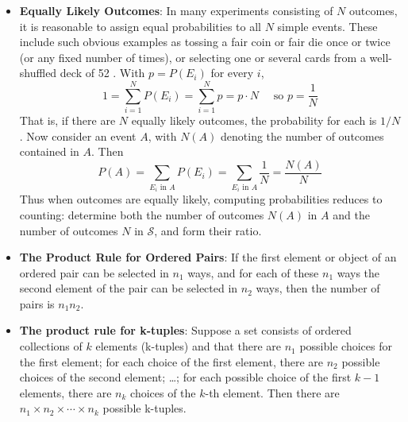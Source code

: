 \documentclass{report}
\begin{document}
\begin{itemize}
$$            $$
        \item \textbf{Equally Likely Outcomes}:
            In many experiments consisting of $N$ outcomes, it is reasonable to assign equal probabilities to all $N$ simple events. These include such obvious examples as tossing a fair coin or fair die once or twice (or any fixed number of times), or selecting one or several cards from a well-shuffled deck of 52 . With $p=P\left(E_i\right)$ for every $i$,
            $$
            1=\sum_{i=1}^N P\left(E_i\right)=\sum_{i=1}^N p=p \cdot N \quad \text { so } p=\frac{1}{N}
            $$
            That is, if there are $N$ equally likely outcomes, the probability for each is $1 / N$.
            \bigbreak \noindent 
            Now consider an event $A$, with $N(A)$ denoting the number of outcomes contained in $A$. Then
            $$
            P(A)=\sum_{E_i \text { in } A} P\left(E_i\right)=\sum_{E_i \text { in } A} \frac{1}{N}=\frac{N(A)}{N}
            $$
            Thus when outcomes are equally likely, computing probabilities reduces to counting: determine both the number of outcomes $N(A)$ in $A$ and the number of outcomes $N$ in $\mathcal{S}$, and form their ratio.
        \item \textbf{The Product Rule for Ordered Pairs}:
            If the first element or object of an ordered pair can be selected in $n_1$ ways, and for each of these $n_1$ ways the second element of the pair can be selected in $n_2$ ways, then the number of pairs is $n_1 n_2$.
        \item \textbf{The product rule for k-tuples}:
            Suppose a set consists of ordered collections of \( k \) elements (k-tuples) and that
            there are \( n_1 \) possible choices for the first element; for each choice of the first
            element, there are \( n_2 \) possible choices of the second element; \ldots; for each
            possible choice of the first $k-1$ elements, there are \( n_k \) choices of the \( k \)-th
            element. Then there are \( n_1 \times n_2 \times \cdots \times n_k \) possible k-tuples.


\end{itemize}
\end{document}
